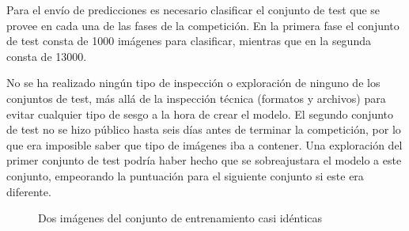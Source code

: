 \begin{itemize}
Para el envío de predicciones es necesario clasificar el conjunto de test que
se provee en cada una de las fases de la competición. En la primera fase el
conjunto de test consta de 1000 imágenes para clasificar, mientras que en la
segunda consta de 13000.

No se ha realizado ningún tipo de inspección o exploración de ninguno de los
conjuntos de test, más allá de la inspección técnica (formatos y archivos) para
evitar cualquier tipo de sesgo a la hora de crear el modelo. El segundo conjunto
de test no se hizo público hasta seis días antes de terminar la competición, por
lo que era imposible saber que tipo de imágenes iba a contener. Una exploración
del primer conjunto de test podría haber hecho que se sobreajustara el modelo a
este conjunto, empeorando la puntuación para el siguiente conjunto si este era
diferente.
        
\end{itemize}

\begin{figure}
  \caption{Dos imágenes del conjunto de entrenamiento casi idénticas}
\label{same_image}
\end{figure}
